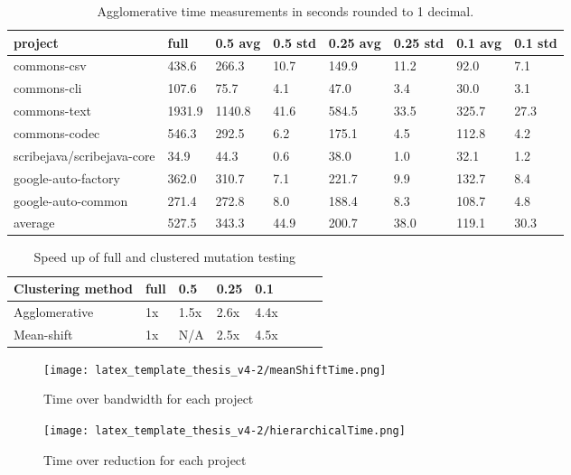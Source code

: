 \documentclass[twoside]{uva-inf-bachelor-thesis}
\begin{document}
\begin{table}[h]
    \centering
    \begin{tabular}{|l|l|l|l|l|l|l|l|}
    \hline
        project & full & 0.5 avg & 0.5 std & 0.25 avg & 0.25 std & 0.1 avg & 0.1 std \\ \hline
        commons-csv & 438.6 & 266.3 & 10.7 & 149.9 & 11.2 & 92.0 & 7.1 \\ \hline
        commons-cli & 107.6 & 75.7 & 4.1 & 47.0 & 3.4 & 30.0 & 3.1 \\ \hline
        commons-text & 1931.9 & 1140.8 & 41.6 & 584.5 & 33.5 & 325.7 & 27.3 \\ \hline
        commons-codec & 546.3 & 292.5 & 6.2 & 175.1 & 4.5 & 112.8 & 4.2 \\ \hline
        scribejava/scribejava-core & 34.9 & 44.3 & 0.6 & 38.0 & 1.0 & 32.1 & 1.2 \\ \hline
        google-auto-factory & 362.0 & 310.7 & 7.1 & 221.7 & 9.9 & 132.7 & 8.4 \\ \hline
        google-auto-common & 271.4 & 272.8 & 8.0 & 188.4 & 8.3 & 108.7 & 4.8 \\ \hline
        average & 527.5 & 343.3 & 44.9 & 200.7 & 38.0 & 119.1 & 30.3 \\ \hline
    \end{tabular}
\caption{Agglomerative time measurements in seconds rounded to 1 decimal.}
\end{table}
\begin{table}[ht!]
    \centering
    \begin{tabular}{|l|l|l|l|l|l|l|l|}
    \hline
        Clustering method & full & 0.5 & 0.25 & 0.1 \\ \hline
        Agglomerative & 1x & 1.5x & 2.6x & 4.4x \\ \hline
        Mean-shift & 1x & N/A & 2.5x & 4.5x \\ \hline
    \end{tabular}
\caption{Speed up of full and clustered mutation testing}
\end{table}
\begin{figure}[h!]
    \centering
    \texttt{[image: latex\_template\_thesis\_v4-2/meanShiftTime.png]}
    \caption{Time over bandwidth for each project}
    \label{fig:my_label}
\end{figure}
\begin{figure}[h!]
    \centering
    \texttt{[image: latex\_template\_thesis\_v4-2/hierarchicalTime.png]}
    \caption{Time over reduction for each project}
    \label{fig:my_label}
\end{figure}
\end{document}

